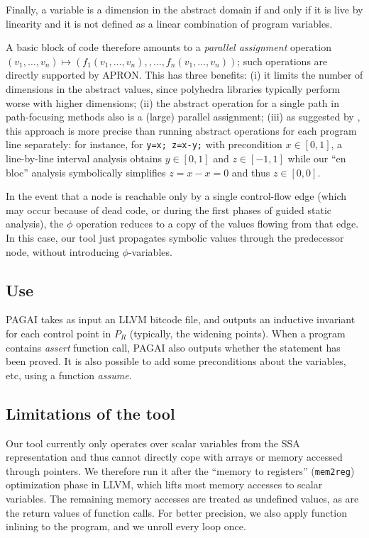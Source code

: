 \documentclass{entcs}
\begin{document}
	Finally, a variable is a dimension in the abstract domain if and only if it
	is live by linearity and it is not defined as a linear combination of
	program variables.

A basic block of code therefore amounts to a \emph{parallel assignment} operation
$(v_1,\dots,v_n) \allowbreak\mapsto\allowbreak
(f_1(v_1,\dots,v_n), \allowbreak, \dots, \allowbreak
 f_n(v_1,\dots,v_n))$;
such operations are directly supported by APRON. This has three benefits:
(i) it limits the number of dimensions in the abstract values, since polyhedra libraries typically perform worse with higher dimensions;
(ii) the abstract operation for a single path in path-focusing methods also is a (large) parallel assignment;
(iii) as suggested by \citet{DBLP:conf/vmcai/Mine06}, this approach is more precise than running abstract operations for each program line separately:
for instance, for \lstinline|y=x; z=x-y;| with precondition $x \in [0,1]$, a line-by-line interval analysis obtains $y \in [0,1]$ and $z \in [-1,1]$ while our ``en bloc'' analysis symbolically simplifies $z = x - x = 0$ and thus $z \in [0,0]$.

In the event that a node is reachable only by a single control-flow edge (which may occur because of dead code, or during the first phases of guided static analysis), the $\phi$ operation reduces to a copy of the values flowing from that edge. In this case, our tool just propagates symbolic values through the predecessor node, without introducing $\phi$-variables.

\subsection{Use}

PAGAI takes as input an LLVM bitcode file, and outputs an inductive invariant
for each control point in $P_R$ (typically, the widening points).
When a program contains \emph{assert} function call, PAGAI also outputs whether
the statement has been proved.
It is also possible to add some preconditions about the variables, etc, using a
function \emph{assume}.
\subsection{Limitations of the tool}

Our tool currently only operates over scalar variables from the SSA representation and thus cannot directly cope with arrays or memory accessed through pointers. We therefore run it after the ``memory to registers'' (\texttt{mem2reg}) optimization phase in LLVM, which lifts most memory accesses to scalar variables.
The remaining memory accesses are treated as undefined values, as are the return
values of function calls. For better precision, we also apply function inlining
to the program, and we unroll every loop once.
\end{document}
